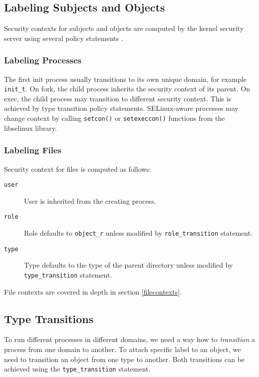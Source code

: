 \subsection{Labeling Subjects and Objects}
Security contexts for subjects and objects are computed by the kernel security
server using several policy statements \cite[pp.~31--33]{tsn}.

\subsubsection{Labeling Processes}
The first init process usually transitions to its own unique domain, for example
\texttt{init\_t}. On fork, the child process inherits the security context of
its parent. On exec, the child process may transition to different security
context. This is achieved by type transition policy statements. SELinux-aware
processes may change context by calling \texttt{setcon()} or
\texttt{setexeccon()} functions from the libselinux library.

\subsubsection{Labeling Files}
Security context for files is computed as follows:
\begin{description}
    \item [\texttt{user}] User is inherited from the creating process.
    \item [\texttt{role}] Role defaults to \texttt{object\_r} unless modified by
        \texttt{role\_transition} statement.
    \item [\texttt{type}] Type defaults to the type of the parent directory
        unless modified by \texttt{type\_transition} statement.
\end{description}
File contexts are covered in depth in section \ref{filecontexts}.

\subsection{Type Transitions}
\label{typetransitions}
To run different processes in different domains, we need a way how to
\emph{transition} a process from one domain to another. To attach specific label
to an object, we need to transition an object from one type to another. Both
transitions can be achieved using the \texttt{type\_transition} statement.

